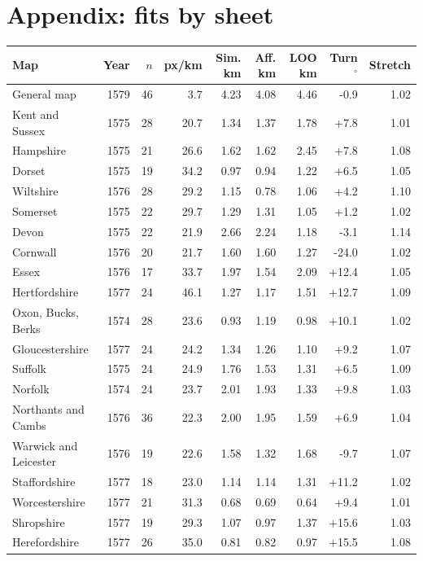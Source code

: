\documentclass[11pt,a4paper]{article}
\begin{document}
\clearpage
\section*{Appendix: fits by sheet}
{\small\begin{longtable}{lrrrrrrrr}\toprule
Map & Year & $n$ & px/km & Sim. km & Aff. km & LOO km & Turn$^\circ$ & Stretch\\\midrule\endhead
General map & 1579 & 46 & 3.7 & 4.23 & 4.08 & 4.46 & -0.9 & 1.02 \\
Kent and Sussex & 1575 & 28 & 20.7 & 1.34 & 1.37 & 1.78 & +7.8 & 1.01 \\
Hampshire & 1575 & 21 & 26.6 & 1.62 & 1.62 & 2.45 & +7.8 & 1.08 \\
Dorset & 1575 & 19 & 34.2 & 0.97 & 0.94 & 1.22 & +6.5 & 1.05 \\
Wiltshire & 1576 & 28 & 29.2 & 1.15 & 0.78 & 1.06 & +4.2 & 1.10 \\
Somerset & 1575 & 22 & 29.7 & 1.29 & 1.31 & 1.05 & +1.2 & 1.02 \\
Devon & 1575 & 22 & 21.9 & 2.66 & 2.24 & 1.18 & -3.1 & 1.14 \\
Cornwall & 1576 & 20 & 21.7 & 1.60 & 1.60 & 1.27 & -24.0 & 1.02 \\
Essex & 1576 & 17 & 33.7 & 1.97 & 1.54 & 2.09 & +12.4 & 1.05 \\
Hertfordshire & 1577 & 24 & 46.1 & 1.27 & 1.17 & 1.51 & +12.7 & 1.09 \\
Oxon, Bucks, Berks & 1574 & 28 & 23.6 & 0.93 & 1.19 & 0.98 & +10.1 & 1.02 \\
Gloucestershire & 1577 & 24 & 24.2 & 1.34 & 1.26 & 1.10 & +9.2 & 1.07 \\
Suffolk & 1575 & 24 & 24.9 & 1.76 & 1.53 & 1.31 & +6.5 & 1.09 \\
Norfolk & 1574 & 24 & 23.7 & 2.01 & 1.93 & 1.33 & +9.8 & 1.03 \\
Northants and Cambs & 1576 & 36 & 22.3 & 2.00 & 1.95 & 1.59 & +6.9 & 1.04 \\
Warwick and Leicester & 1576 & 19 & 22.6 & 1.58 & 1.32 & 1.68 & -9.7 & 1.07 \\
Staffordshire & 1577 & 18 & 23.0 & 1.14 & 1.14 & 1.31 & +11.2 & 1.02 \\
Worcestershire & 1577 & 21 & 31.3 & 0.68 & 0.69 & 0.64 & +9.4 & 1.01 \\
Shropshire & 1577 & 19 & 29.3 & 1.07 & 0.97 & 1.37 & +15.6 & 1.03 \\
Herefordshire & 1577 & 26 & 35.0 & 0.81 & 0.82 & 0.97 & +15.5 & 1.08 \\

\end{longtable}}
\end{document}
